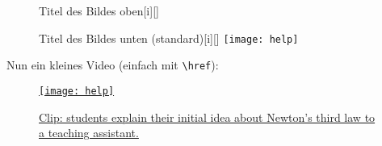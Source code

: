 \lipsum[1-1]%
\begin{figure}
	\begingroup%
	\begin{captionbeside}{Titel des Bildes oben}[i][\linewidth]%
	\end{captionbeside}\label{fig:Gleitumgebungen:Titel des Bildes oben}%
	\endgroup%
\end{figure}
\lipsum[1-1]%
\begin{figure}
	\begin{captionbeside}{Titel des Bildes unten (standard)}[i][\linewidth]%
		\texttt{[image: help]}%
	\end{captionbeside}\label{fig:Gleitumgebungen:Titel des Bildes unten}%
\end{figure}
\lipsum[1-3]\par\medskip%
Nun ein kleines Video (einfach mit \verb|\href|):%
\begin{figure}%
	\hfill%
	\href{https://www.youtube.com/watch?v=mg26ViPfJxA&list=RDmg26ViPfJxA&start_radio=1}{\texttt{[image: help]}}%
	\hspace*{\fill}%
	\caption[Students explain their initial idea about Newton's third law to a teaching assistant.]{\hypersetup{urlcolor=black}\href{https://www.youtube.com/watch?v=-GLqQIs4Dm0}{Clip: students explain their initial idea about Newton's third law to a teaching assistant.}}%
	\label{fig:Gleitumgebungen:Video 1}%
\end{figure}




